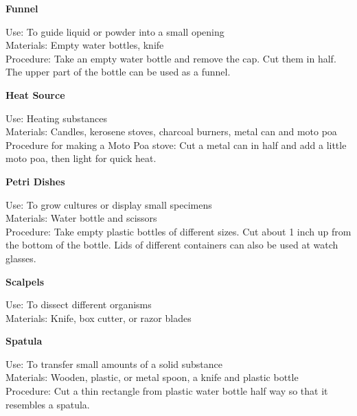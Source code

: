 \begin{flushleft}
\textbf{Funnel}
\end{flushleft}
\vspace{-10pt}
Use: To guide liquid or powder into a small opening\\
Materials: Empty water bottles, knife\\
Procedure: Take an empty water bottle and remove the cap. Cut them in half. The upper part of the bottle can be used as a funnel.\\

\begin{flushleft}
\textbf{Heat Source}
\end{flushleft}
\vspace{-10pt}
Use: Heating substances\\
Materials: Candles, kerosene stoves, charcoal burners, metal can and moto poa\\
Procedure for making a Moto Poa stove: Cut a metal can in half and add a little moto poa, then light for quick heat.\\


\begin{flushleft}
\textbf{Petri Dishes}
\end{flushleft}
\vspace{-10pt}
Use: To grow cultures or display small specimens\\
Materials: Water bottle and scissors\\
Procedure: Take empty plastic bottles of different sizes. Cut about 1 inch up from the bottom of the bottle. Lids of different containers can also be used at watch glasses.\\

\begin{flushleft}
\textbf{Scalpels}
\end{flushleft}
\vspace{-10pt}
Use: To dissect different organisms \\
Materials: Knife, box cutter, or razor blades\\


\begin{flushleft}
\textbf{Spatula}
\end{flushleft}
\vspace{-10pt}
Use: To transfer small amounts of a solid substance\\
Materials: Wooden, plastic, or metal spoon, a knife and plastic bottle\\
Procedure: Cut a thin rectangle from plastic water bottle half way so that it resembles a spatula.\\

